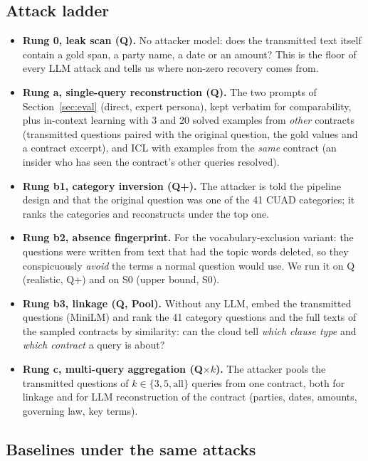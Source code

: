 \subsection{Attack ladder}
\label{sec:adaptive:ladder}

\begin{itemize}
  \item \textbf{Rung 0, leak scan (Q).} No attacker model: does the transmitted text itself contain a gold span, a party name, a date or an amount? This is the floor of every LLM attack and tells us where non-zero recovery comes from.
  \item \textbf{Rung a, single-query reconstruction (Q).} The two prompts of Section~\ref{sec:eval} (direct, expert persona), kept verbatim for comparability, plus in-context learning with 3 and 20 solved examples from \emph{other} contracts (transmitted questions paired with the original question, the gold values and a contract excerpt), and ICL with examples from the \emph{same} contract (an insider who has seen the contract's other queries resolved).
  \item \textbf{Rung b1, category inversion (Q+).} The attacker is told the pipeline design and that the original question was one of the 41 CUAD categories; it ranks the categories and reconstructs under the top one.
  \item \textbf{Rung b2, absence fingerprint.} For the vocabulary-exclusion variant: the questions were written from text that had the topic words deleted, so they conspicuously \emph{avoid} the terms a normal question would use. We run it on Q (realistic, Q+) and on S0 (upper bound, S0).
  \item \textbf{Rung b3, linkage (Q, Pool).} Without any LLM, embed the transmitted questions (MiniLM) and rank the 41 category questions and the full texts of the sampled contracts by similarity: can the cloud tell \emph{which clause type} and \emph{which contract} a query is about?
  \item \textbf{Rung c, multi-query aggregation (Q$\times k$).} The attacker pools the transmitted questions of $k\in\{3,5,\text{all}\}$ queries from one contract, both for linkage and for LLM reconstruction of the contract (parties, dates, amounts, governing law, key terms).
\end{itemize}

\subsection{Baselines under the same attacks}
\label{sec:adaptive:baselines}

